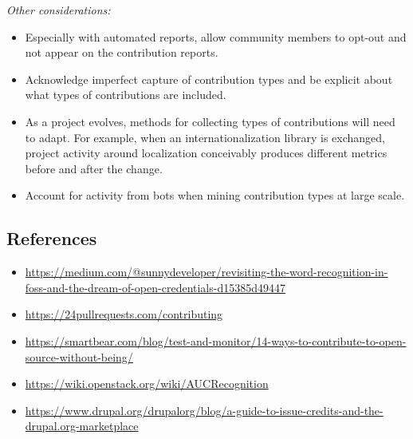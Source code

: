 \emph{Other considerations:}

\begin{itemize}
\tightlist
\item
  Especially with automated reports, allow community members to opt-out
  and not appear on the contribution reports.
\item
  Acknowledge imperfect capture of contribution types and be explicit
  about what types of contributions are included.
\item
  As a project evolves, methods for collecting types of contributions
  will need to adapt. For example, when an internationalization library
  is exchanged, project activity around localization conceivably
  produces different metrics before and after the change.
\item
  Account for activity from bots when mining contribution types at large
  scale.
\end{itemize}

\hypertarget{references}{%
\subsection{References}\label{references}}

\begin{itemize}
\tightlist
\item
  \url{https://medium.com/@sunnydeveloper/revisiting-the-word-recognition-in-foss-and-the-dream-of-open-credentials-d15385d49447}
\item
  \url{https://24pullrequests.com/contributing}
\item
  \url{https://smartbear.com/blog/test-and-monitor/14-ways-to-contribute-to-open-source-without-being/}
\item
  \url{https://wiki.openstack.org/wiki/AUCRecognition}
\item
  \url{https://www.drupal.org/drupalorg/blog/a-guide-to-issue-credits-and-the-drupal.org-marketplace}
\end{itemize}

